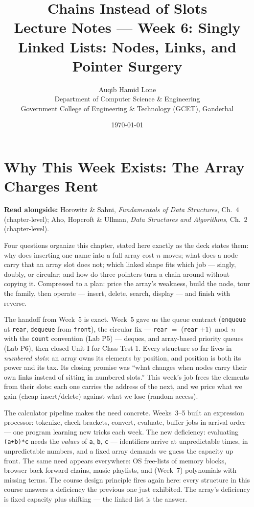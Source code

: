 \documentclass[11pt]{article}
\title{Chains Instead of Slots\\\large Lecture Notes --- Week 6: Singly Linked Lists: Nodes, Links, and Pointer Surgery}
\author{Auqib Hamid Lone\\[0.3em]
  \small Department of Computer Science \& Engineering\\
  \small Government College of Engineering \& Technology (GCET), Ganderbal}
\date{\today}
\begin{document}
\maketitle

\section{Why This Week Exists: The Array Charges Rent}

\textbf{Read alongside:} Horowitz \& Sahni, \textit{Fundamentals of Data Structures}, Ch.~4 (chapter-level); Aho, Hopcroft \& Ullman, \textit{Data Structures and Algorithms}, Ch.~2 (chapter-level).

Four questions organize this chapter, stated here exactly as the deck states them: why does inserting one name into a full array cost $n$ moves; what does a node carry that an array slot does not; which linked shape fits which job --- singly, doubly, or circular; and how do three pointers turn a chain around without copying it. Compressed to a plan: price the array's weakness, build the node, tour the family, then operate --- insert, delete, search, display --- and finish with reverse.

The handoff from Week~5 is exact. Week~5 gave us the queue contract (\texttt{enqueue} at \texttt{rear}, \texttt{dequeue} from \texttt{front}), the circular fix --- \texttt{rear} $=$ (\texttt{rear} $+ 1) \bmod n$ with the \texttt{count} convention (Lab P5) --- deques, and array-based priority queues (Lab P6), then closed Unit I for Class Test 1. Every structure so far lives in \emph{numbered slots}: an array owns its elements by position, and position is both its power and its tax. Its closing promise was ``what changes when nodes carry their own links instead of sitting in numbered slots.'' This week's job frees the elements from their slots: each one carries the address of the next, and we price what we gain (cheap insert/delete) against what we lose (random access).

The calculator pipeline makes the need concrete. Weeks~3--5 built an expression processor: tokenize, check brackets, convert, evaluate, buffer jobs in arrival order --- one program learning new tricks each week. The new deficiency: evaluating \texttt{(a+b)*c} needs the \emph{values} of \texttt{a}, \texttt{b}, \texttt{c} --- identifiers arrive at unpredictable times, in unpredictable numbers, and a fixed array demands we guess the capacity up front. The same need appears everywhere: OS free-lists of memory blocks, browser back-forward chains, music playlists, and (Week~7) polynomials with missing terms. The course design principle fires again here: every structure in this course answers a deficiency the previous one just exhibited. The array's deficiency is fixed capacity plus shifting --- the linked list is the answer.
\end{document}
